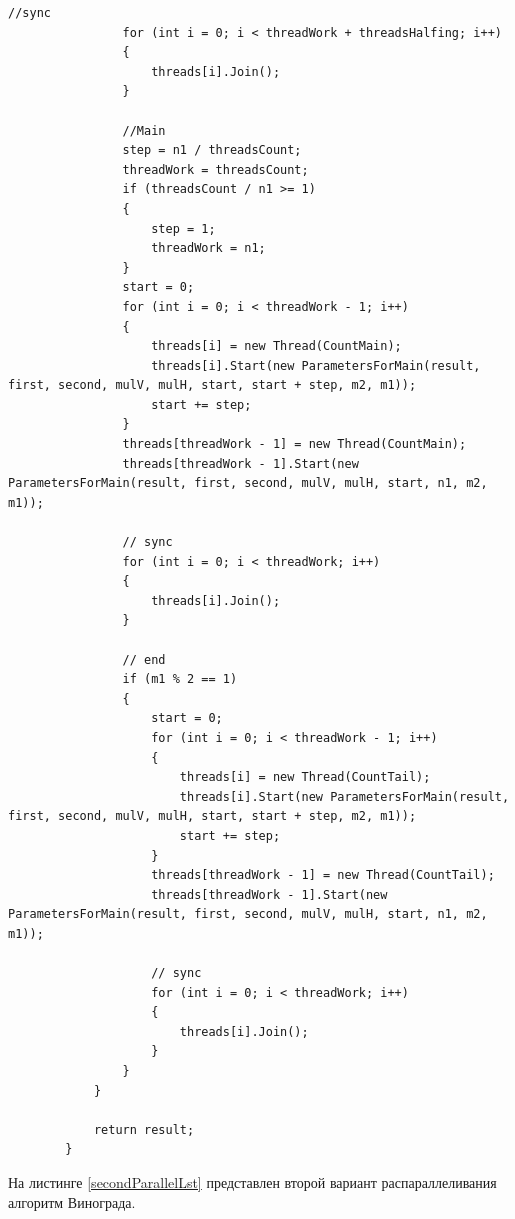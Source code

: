 \documentclass{article}
\begin{document}
\begin{lstlisting}[label=firstParallelLst,caption=Первый вариант распараллеливания алгоритм Винограда]
                //sync
                for (int i = 0; i < threadWork + threadsHalfing; i++)
                {
                    threads[i].Join();
                }

                //Main
                step = n1 / threadsCount;
                threadWork = threadsCount;
                if (threadsCount / n1 >= 1)
                {
                    step = 1;
                    threadWork = n1;
                }
                start = 0;
                for (int i = 0; i < threadWork - 1; i++)
                {
                    threads[i] = new Thread(CountMain);
                    threads[i].Start(new ParametersForMain(result, first, second, mulV, mulH, start, start + step, m2, m1));
                    start += step;
                }
                threads[threadWork - 1] = new Thread(CountMain);
                threads[threadWork - 1].Start(new ParametersForMain(result, first, second, mulV, mulH, start, n1, m2, m1));

                // sync
                for (int i = 0; i < threadWork; i++)
                {
                    threads[i].Join();
                }

                // end
                if (m1 % 2 == 1)
                {
                    start = 0;
                    for (int i = 0; i < threadWork - 1; i++)
                    {
                        threads[i] = new Thread(CountTail);
                        threads[i].Start(new ParametersForMain(result, first, second, mulV, mulH, start, start + step, m2, m1));
                        start += step;
                    }
                    threads[threadWork - 1] = new Thread(CountTail);
                    threads[threadWork - 1].Start(new ParametersForMain(result, first, second, mulV, mulH, start, n1, m2, m1));

                    // sync
                    for (int i = 0; i < threadWork; i++)
                    {
                        threads[i].Join();
                    }
                }
            }

            return result;
        }
	\end{lstlisting}
		На листинге \hyperref[secondParallelLst]{\ref{secondParallelLst}} представлен второй вариант распараллеливания алгоритм Винограда.
\end{document}
